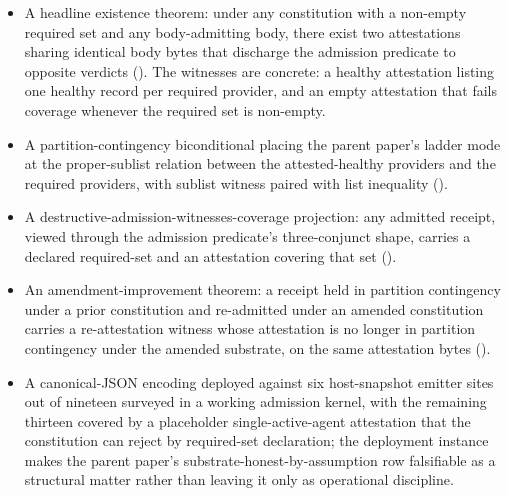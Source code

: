 \begin{itemize}
  \item A headline existence theorem: under any constitution with a non-empty required set and any body-admitting body, there exist two attestations sharing identical body bytes that discharge the admission predicate to opposite verdicts (). The witnesses are concrete: a healthy attestation listing one healthy record per required provider, and an empty attestation that fails coverage whenever the required set is non-empty.
  \item A partition-contingency biconditional placing the parent paper's ladder mode at the proper-sublist relation between the attested-healthy providers and the required providers, with sublist witness paired with list inequality ().
  \item A destructive-admission-witnesses-coverage projection: any admitted receipt, viewed through the admission predicate's three-conjunct shape, carries a declared required-set and an attestation covering that set ().
  \item An amendment-improvement theorem: a receipt held in partition contingency under a prior constitution and re-admitted under an amended constitution carries a re-attestation witness whose attestation is no longer in partition contingency under the amended substrate, on the same attestation bytes ().
  \item A canonical-JSON encoding deployed against six host-snapshot emitter sites out of nineteen surveyed in a working admission kernel, with the remaining thirteen covered by a placeholder single-active-agent attestation that the constitution can reject by required-set declaration; the deployment instance makes the parent paper's substrate-honest-by-assumption row falsifiable as a structural matter rather than leaving it only as operational discipline.
\end{itemize}
